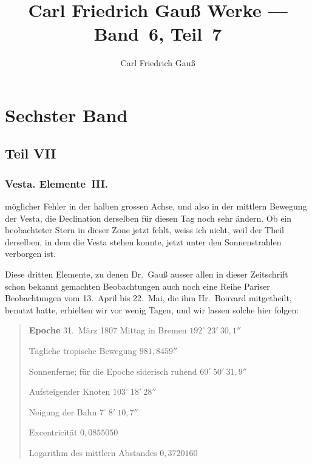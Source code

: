 \documentclass[12pt,a4paper]{book}
\title{Carl Friedrich Gau{\ss} Werke --- Band~6, Teil~7}
\author{Carl Friedrich Gau{\ss}}
\date{}
\begin{document}
\frontmatter
\maketitle
\thispagestyle{empty}

\mainmatter

\setcounter{chapter}{6}
\chapter*{Sechster Band}

\section*{Teil VII}



\subsection*{Vesta. Elemente~III.}

m\"oglicher Fehler in der halben grossen Achse, und also in der mittlern Bewegung der Vesta, die Declination derselben f\"ur diesen Tag noch sehr \"andern. Ob ein beobachteter Stern in dieser Zone jetzt fehlt, weiss ich nicht, weil der Theil derselben, in dem die Vesta stehen konnte, jetzt unter den Sonnenstrahlen verborgen ist.

Diese dritten Elemente, zu denen Dr.~Gau{\ss} ausser allen in dieser Zeitschrift schon bekannt gemachten Beobachtungen auch noch eine Reihe Pariser Beobachtungen vom 13.~April bis 22.~Mai, die ihm Hr.~Bouvard mitgetheilt, benutzt hatte, erhielten wir vor wenig Tagen, und wir lassen solche hier folgen:

\begin{quote}
\textbf{Epoche} 31.~M\"arz 1807 Mittag in Bremen \dotfill $192^{\circ}\ 23'\ 30{,}1''$

T\"agliche tropische Bewegung \dotfill $981{,}8459''$

Sonnenferne; f\"ur die Epoche siderisch ruhend \dotfill $69^{\circ}\ 50'\ 31{,}9''$

Aufsteigender Knoten \dotfill $103^{\circ}\ 18'\ 28''$

Neigung der Bahn \dotfill $7^{\circ}\ 8'\ 10{,}7''$

Excentricit\"at \dotfill $0{,}0855050$

Logarithm des mittlern Abstandes \dotfill $0{,}3720160$
\end{quote}
\end{document}

